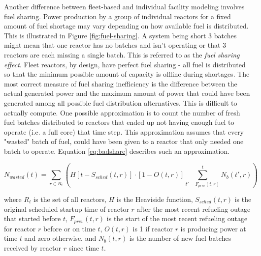 \documentclass{style}
\begin{document}
Another difference between fleet-based and individual facility modeling
involves fuel sharing.  Power production by a group of individual reactors for
a fixed amount of fuel shortage may vary depending on how available fuel is
distributed.  This is illustrated in Figure \ref{fig:fuel-sharing}.  A system
being short 3 batches might mean that one reactor has no batches and isn't
operating or that 3 reactors are each missing a single batch.  This is
referred to as the \emph{fuel sharing effect}.  Fleet reactors, by design,
have perfect fuel sharing - all fuel is distributed so that the minimum
possible amount of capacity is offline during shortages. The most correct
measure of fuel sharing inefficiency is the difference between the actual
generated power and the maximum amount of power that could have been generated
among all possible fuel distribution alternatives.  This is difficult to
actually compute. One possible approximation is to count the number of fresh
fuel batches distributed to reactors that ended up not having enough fuel to
operate (i.e. a full core) that time step.  This approximation assumes that
every "wasted" batch of fuel, could have been given to a reactor that only
needed one batch to operate.  Equation \ref{eq:badshare} describes such an
approximation.

\begin{equation}
    N_{wasted}(t) = \sum\limits_{r \in R_t} \left(H[t-S_{sched}(t,r)] \cdot [1-O(t,r)]  \sum\limits_{t'=F_{prev}(t,r)}^{t} N_b(t',r) \right)
    \label{eq:badshare}
\end{equation}

where $R_t$ is the set of all reactors, $H$ is the Heaviside function,
$S_{sched}(t,r)$ is the original scheduled startup time of reactor $r$ after
the most recent refueling outage that started before $t$, $F_{prev}(t,r)$ is
the start of the most recent refueling outage for reactor $r$ before or on
time $t$, $O(t,r)$ is 1 if reactor $r$ is producing power at time $t$ and zero
otherwise, and $N_b(t,r)$ is the number of new fuel batches received by
reactor $r$ since time $t$.
\end{document}

